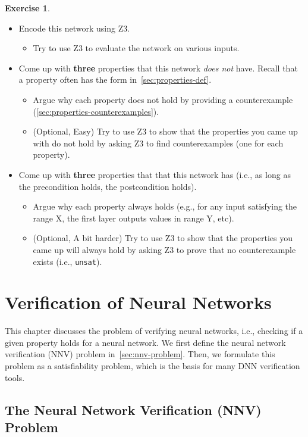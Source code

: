 \documentclass[oneside,11pt,dvipsnames]{book}
\numberwithin{equation}{section}
\theoremstyle{definition}
\newtheorem{exercise}{Exercise}[section]
\theoremstyle{remark}
\begin{document}
\begin{exercise}
\begin{itemize}
    \item Encode this network using Z3.
    \begin{itemize}
        \item Try to use Z3 to evaluate the network on various inputs.
    \end{itemize}
\item Come up with \textbf{three} properties that this network \emph{does not} have.  Recall that a property often has the form in~\autoref{sec:properties-def}. 
\begin{itemize}
    \item Argue why each property does not hold by providing a counterexample (\autoref{sec:properties-counterexamples}).
    \item (Optional, Easy) Try to use Z3 to show that the properties you came up with do not hold by asking Z3 to find counterexamples (one for each property).
\end{itemize}
\item Come up with \textbf{three} properties that that this network has (i.e., as long as the precondition holds, the postcondition holds).   
\begin{itemize}
    \item Argue why each property always holds (e.g., for any input satisfying the range X, the first layer outputs values in range Y, etc).
    \item (Optional, A bit harder) Try to use Z3 to show that the properties you came up will always hold by asking Z3 to prove that no counterexample exists (i.e., \texttt{unsat}).  
\end{itemize}
\end{itemize}

\end{exercise}

\chapter{Verification of Neural Networks}\label{sec:verification}

This chapter discusses the problem of verifying neural networks, i.e., checking if a given property holds for a neural network. 
We first define the neural network verification (NNV) problem in~\autoref{sec:nnv-problem}. Then, we formulate this problem as a satisfiability problem, which is the basis for many DNN verification tools.

\section{The Neural Network Verification (NNV) Problem}\label{sec:nnv-problem}
\end{document}
